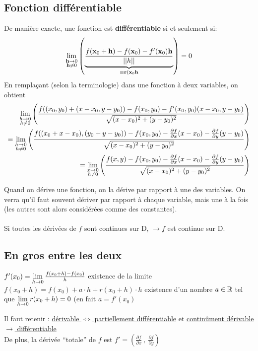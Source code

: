 \documentclass[12pt,a4paper]{article}
\renewcommand{\)}{\right)}
\renewcommand{\(}{\left(}
\begin{document}
\subsection{Fonction différentiable}
De manière exacte, une fonction est \textbf{différentiable} si et seulement si:
\begin{equation*}
	\lim\limits_{\substack{\textbf{h}\to 0 \\ \textbf{h} \neq 0}}\left(\underbrace{\frac{f(\textbf{x}_0 + \textbf{h}) - f(\textbf{x}_0) - f'(\textbf{x}_0)\textbf{h}}{||h||}}_{\equiv \textbf{r}(\textbf{x}_0\textbf{h}}\right) = 0
\end{equation*}
En remplaçant (selon la terminologie) dans une fonction à deux variables, on obtient 
\begin{align*}
	\lim\limits_{\substack{h\to 0 \\ h\neq 0}}\left(\frac{f((x_0,y_0) + (x-x_0,y-y_0)) - f(x_0,y_0) - f'(x_0,y_0)(x-x_0,y-y_0)}{\sqrt{(x-x_0)^2 + (y-y_0)^2}}\right) \\
	= \lim\limits_{\substack{h\to 0 \\ h\neq 0}}\left(\frac{f((x_0 + x - x_0),(y_0+y-y_0)) - f(x_0,y_0) - \frac{\partial f}{\partial x}(x-x_0) - \frac{\partial f}{\partial y}(y-y_0)}{\sqrt{(x-x_0)^2 + (y-y_0)^2}}\right)\\
	= \lim\limits_{\substack{x\to 0 \\ h\neq 0}}\left(\frac{f(x,y) - f(x_0,y_0) - \frac{\partial f}{\partial x}(x-x_0) - \frac{\partial f}{\partial y}(y-y_0)}{\sqrt{(x-x_0)^2 + (y-y_0)^2}}\right)
 \end{align*}

Quand on dérive une fonction, on la dérive par rapport à une des variables. On verra qu'il faut souvent dériver par rapport à chaque variable, mais une à la fois (les autres sont alors considérées comme des constantes).\\
\\
 Si toutes les dérivées de $f$ sont continues sur D, $\to f$ est continue sur D.
\subsection{En gros entre les deux}
 $f'(x_0) = \lim\limits_{h\to 0} \frac{f(x_0+h) - f(x_0)}{h}$ existence de la limite\\
 $f(x_0+h) = f(x_0) + a\cdot h + r(x_0+h) \cdot h$ existence d'un nombre $a \in \mathbb{R}$ tel que $\lim\limits_{h\to 0}r(x_0+h) = 0$ (en fait $a = f'(x_0)$

Il faut retenir : \uline{dérivable $\iff$ partiellement différentiable} et \uline{continûment dérivable $\to$ différentiable}\\
De plus, la dérivée \enquote{totale} de $f$ est $f' = \(\frac{\partial f}{\partial x} \ , \ \frac{\partial f}{\partial y}\)$
\end{document}
